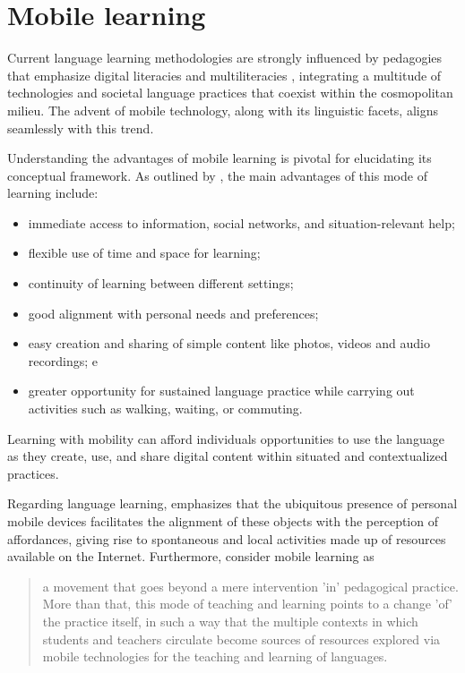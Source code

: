 \section{Mobile learning}\label{sec-mobilelearning}

Current language learning methodologies are strongly influenced by pedagogies that emphasize digital literacies \cite{dudeney2016} and multiliteracies \cite{cazden1996}, integrating a multitude of technologies and societal language practices that coexist within the cosmopolitan milieu. The advent of mobile technology, along with its linguistic facets, aligns seamlessly with this trend.

Understanding the advantages of mobile learning is pivotal for elucidating its conceptual framework. As outlined by \textcite[p. 1]{kukulska2010}, the main advantages of this mode of learning include:

\begin{itemize}
	\item immediate access to information, social networks, and situation-relevant help;
	\item flexible use of time and space for learning;
	\item continuity of learning between different settings;
	\item good alignment with personal needs and preferences;
	\item easy creation and sharing of simple content like photos, videos and audio recordings; e
	\item greater opportunity for sustained language practice while carrying out activities such as walking, waiting, or commuting.
\end{itemize}

Learning with mobility can afford individuals opportunities to use the language as they create, use, and share digital content within situated and contextualized practices.

Regarding language learning, \textcite{braga2017a} emphasizes that the ubiquitous presence of personal mobile devices facilitates the alignment of these objects with the perception of affordances, giving rise to spontaneous and local activities made up of resources available on the Internet. Furthermore, \textcite[p. 49–50]{braga2017b} consider mobile learning as

\begin{quote}
	a movement that goes beyond a mere intervention 'in' pedagogical practice. More than that, this mode of teaching and learning points to a change 'of' the practice itself, in such a way that the multiple contexts in which students and teachers circulate become sources of resources explored via mobile technologies for the teaching and learning of languages.
\end{quote}


